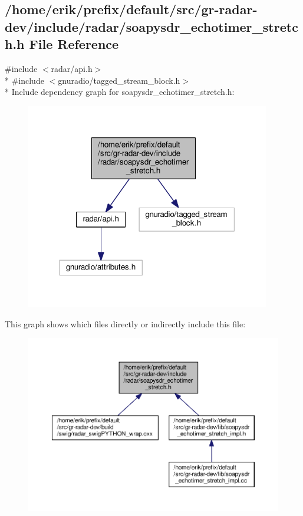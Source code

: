 \subsection{/home/erik/prefix/default/src/gr-\/radar-\/dev/include/radar/soapysdr\+\_\+echotimer\+\_\+stretch.h File Reference}
\label{soapysdr__echotimer__stretch_8h}
{\ttfamily \#include $<$radar/api.\+h$>$}\\*
{\ttfamily \#include $<$gnuradio/tagged\+\_\+stream\+\_\+block.\+h$>$}\\*
Include dependency graph for soapysdr\+\_\+echotimer\+\_\+stretch.\+h\+:
\nopagebreak
\begin{figure}[H]
\begin{center}
\leavevmode
\includegraphics[width=302pt]{d8/d9c/soapysdr__echotimer__stretch_8h__incl}
\end{center}
\end{figure}
This graph shows which files directly or indirectly include this file\+:
\nopagebreak
\begin{figure}[H]
\begin{center}
\leavevmode
\includegraphics[width=350pt]{d1/dd7/soapysdr__echotimer__stretch_8h__dep__incl}
\end{center}
\end{figure}
